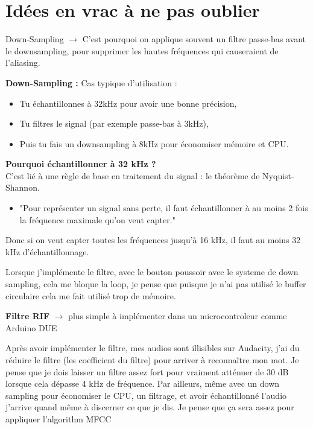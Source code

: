 \documentclass[a4paper,11pt]{article}
\begin{document}
\newpage
\tableofcontents
\newpage

\section{Idées en vrac à ne pas oublier}
Down-Sampling $\rightarrow$ C’est pourquoi on applique souvent un filtre passe-bas avant le downsampling, pour supprimer les hautes fréquences qui causeraient de l’aliasing.

\textbf{Down-Sampling :}
Cas typique d’utilisation :
\begin{itemize}
   \item Tu échantillonnes à 32kHz pour avoir une bonne précision,
   \item Tu filtres le signal (par exemple passe-bas à 3kHz),
  \item Puis tu fais un downsampling à 8kHz pour économiser mémoire et CPU.
\end{itemize}

\textbf{Pourquoi échantillonner à 32 kHz ?} \\
C’est lié à une règle de base en traitement du signal : le théorème de Nyquist-Shannon.
\begin{itemize}
\item  "Pour représenter un signal sans perte, il faut échantillonner à au moins 2 fois la fréquence maximale qu'on veut capter." 
\end{itemize}

Donc si on veut capter toutes les fréquences jusqu’à 16 kHz, il faut au moins 32 kHz d’échantillonnage.

Lorsque j'implémente le filtre, avec le bouton poussoir avec le systeme de down sampling, cela me bloque la loop, je pense que puisque je n'ai pas utilisé le buffer circulaire cela me fait utilisé trop de mémoire.

\textbf{Filtre RIF} $\rightarrow$ plus simple à implémenter dans un microcontroleur comme Arduino DUE

Après avoir implémenter le filtre, mes audios sont illisibles sur Audacity, j'ai du réduire le filtre (les coefficient du filtre) pour arriver à reconnaître mon mot. Je pense que je dois laisser un filtre assez fort pour vraiment atténuer de 30 dB lorsque cela dépasse 4 kHz de fréquence. Par ailleurs, même avec un down sampling pour économiser le CPU, un filtrage, et avoir échantillonné l'audio j'arrive quand même à discerner ce que je dis. Je pense que ça sera assez pour appliquer l'algorithm MFCC
\end{document}
